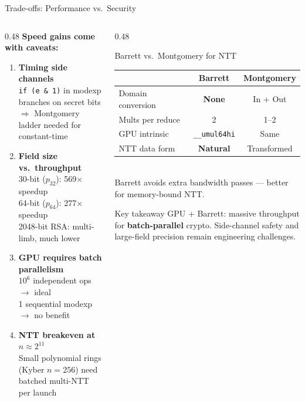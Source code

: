 \documentclass[aspectratio=169,10pt]{beamer}
\begin{document}
\begin{frame}{Trade-offs: Performance vs.\ Security}

\begin{columns}
\begin{column}{0.48\textwidth}
  \textbf{Speed gains come with caveats:}\\[0.6em]
  \begin{enumerate}
    \item \textbf{Timing side channels}\\
          \texttt{if (e \& 1)} in modexp branches on secret bits\\
          $\Rightarrow$ Montgomery ladder needed for constant-time
    \vspace{0.4em}
    \item \textbf{Field size vs.\ throughput}\\
          30-bit ($p_{32}$): 569$\times$ speedup\\
          64-bit ($p_{64}$): 277$\times$ speedup\\
          2048-bit RSA: multi-limb, much lower
    \vspace{0.4em}
    \item \textbf{GPU requires batch parallelism}\\
          $10^6$ independent ops $\rightarrow$ ideal\\
          1 sequential modexp $\rightarrow$ no benefit
    \vspace{0.4em}
    \item \textbf{NTT breakeven at $n \approx 2^{11}$}\\
          Small polynomial rings (Kyber $n{=}256$) need batched multi-NTT per launch
  \end{enumerate}
\end{column}
\begin{column}{0.48\textwidth}
  \begin{block}{Barrett vs.\ Montgomery for NTT}
    \begin{tabular}{lcc}
      \toprule
       & Barrett & Montgomery \\
      \midrule
      Domain conversion & \textbf{None} & In + Out \\
      Mults per reduce & 2 & 1--2 \\
      GPU intrinsic & \texttt{\_\_umul64hi} & Same \\
      NTT data form & \textbf{Natural} & Transformed \\
      \bottomrule
    \end{tabular}\\[0.4em]
    \small Barrett avoids extra bandwidth passes — better for memory-bound NTT.
  \end{block}
  \vspace{0.4em}
  \begin{alertblock}{Key takeaway}
    GPU + Barrett: massive throughput for \textbf{batch-parallel} crypto. Side-channel safety
    and large-field precision remain engineering challenges.
  \end{alertblock}
\end{column}
\end{columns}

\end{frame}
\end{document}
